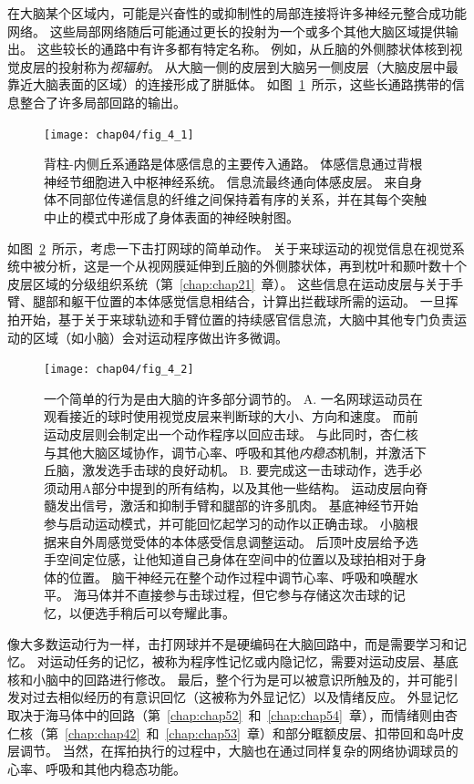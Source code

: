 在大脑某个区域内，可能是兴奋性的或抑制性的局部连接将许多神经元整合成功能网络。
这些局部网络随后可能通过更长的投射为一个或多个其他大脑区域提供输出。
这些较长的通路中有许多都有特定名称。
例如，从丘脑的外侧膝状体核到视觉皮层的投射称为\textit{视辐射}。
从大脑一侧的皮层到大脑另一侧皮层（大脑皮层中最靠近大脑表面的区域）的连接形成了胼胝体。
如图~\ref{fig:4_1}~所示，这些长通路携带的信息整合了许多局部回路的输出。


\begin{figure}[htbp]
	\centering
	\texttt{[image: chap04/fig\_4\_1]}
	\caption{背柱-内侧丘系通路是体感信息的主要传入通路。 
		体感信息通过背根神经节细胞进入中枢神经系统。
		信息流最终通向体感皮层。
		来自身体不同部位传递信息的纤维之间保持着有序的关系，并在其每个突触中止的模式中形成了身体表面的神经映射图。}
	\label{fig:4_1}
\end{figure}


如图~\ref{fig:4_2}~所示，考虑一下击打网球的简单动作。
关于来球运动的视觉信息在视觉系统中被分析，这是一个从视网膜延伸到丘脑的外侧膝状体，再到枕叶和颞叶数十个皮层区域的分级组织系统（第~\ref{chap:chap21}~章）。
这些信息在运动皮层与关于手臂、腿部和躯干位置的本体感觉信息相结合，计算出拦截球所需的运动。 
一旦挥拍开始，基于关于来球轨迹和手臂位置的持续感官信息流，大脑中其他专门负责运动的区域（如小脑）会对运动程序做出许多微调。


\begin{figure}[htbp]
	\centering
	\texttt{[image: chap04/fig\_4\_2]}
	\caption{一个简单的行为是由大脑的许多部分调节的。 
		A. 一名网球运动员在观看接近的球时使用视觉皮层来判断球的大小、方向和速度。 
		而前运动皮层则会制定出一个动作程序以回应击球。
		与此同时，杏仁核与其他大脑区域协作，调节心率、呼吸和其他\textit{内稳态}机制，并激活下丘脑，激发选手击球的良好动机。 
		B. 要完成这一击球动作，选手必须动用A部分中提到的所有结构，以及其他一些结构。
		运动皮层向脊髓发出信号，激活和抑制手臂和腿部的许多肌肉。
		基底神经节开始参与启动运动模式，并可能回忆起学习的动作以正确击球。
		小脑根据来自外周感觉受体的本体感受信息调整运动。
		后顶叶皮层给予选手空间定位感，让他知道自己身体在空间中的位置以及球拍相对于身体的位置。
		脑干神经元在整个动作过程中调节心率、呼吸和唤醒水平。
		海马体并不直接参与击球过程，但它参与存储这次击球的记忆，以便选手稍后可以夸耀此事。}
	\label{fig:4_2}
\end{figure}


像大多数运动行为一样，击打网球并不是硬编码在大脑回路中，而是需要学习和记忆。
对运动任务的记忆，被称为程序性记忆或内隐记忆，需要对运动皮层、基底核和小脑中的回路进行修改。
最后，整个行为是可以被意识所触及的，并可能引发对过去相似经历的有意识回忆（这被称为外显记忆）以及情绪反应。
外显记忆取决于海马体中的回路（第~\ref{chap:chap52}~和~\ref{chap:chap54}~章），而情绪则由杏仁核（第~\ref{chap:chap42}~和~\ref{chap:chap53}~章）和部分眶额皮层、扣带回和岛叶皮层调节。
当然，在挥拍执行的过程中，大脑也在通过同样复杂的网络协调球员的心率、呼吸和其他内稳态功能。




